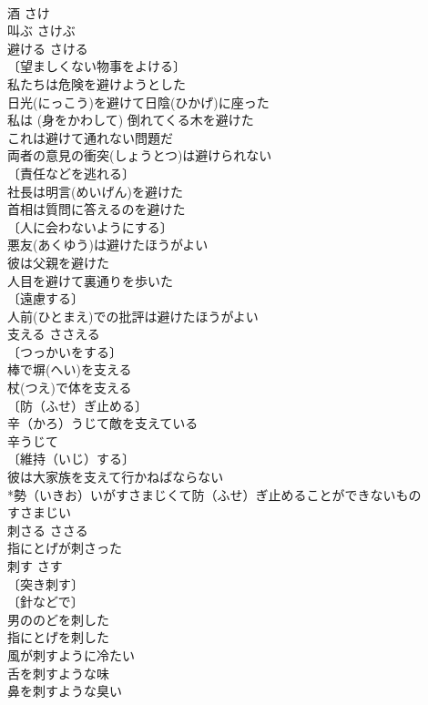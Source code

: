 \documentclass[8pt]{extreport}
\begin{document}
\begin{CJK}{UTF8}{min}
\\	酒	さけ	
\\	叫ぶ	さけぶ	
\\	避ける	さける	
\\	〔望ましくない物事をよける〕
\\	私たちは危険を避けようとした 
\\	日光(にっこう)を避けて日陰(ひかげ)に座った 
\\	私は (身をかわして) 倒れてくる木を避けた 
\\	これは避けて通れない問題だ 
\\	両者の意見の衝突(しょうとつ)は避けられない 
\\	〔責任などを逃れる〕
\\	社長は明言(めいげん)を避けた 
\\	首相は質問に答えるのを避けた 
\\	〔人に会わないようにする〕
\\	悪友(あくゆう)は避けたほうがよい 
\\	彼は父親を避けた 
\\	人目を避けて裏通りを歩いた 
\\	〔遠慮する〕
\\	人前(ひとまえ)での批評は避けたほうがよい 
\\	支える	ささえる	
\\	〔つっかいをする〕
\\	棒で塀(へい)を支える 
\\	杖(つえ)で体を支える 
\\	〔防（ふせ）ぎ止める〕　
\\	辛（かろ）うじて敵を支えている 
\\	辛うじて　 
\\	〔維持（いじ）する〕
\\	彼は大家族を支えて行かねばならない 
\\	*勢（いきお）いがすさまじくて防（ふせ）ぎ止めることができないもの 
\\	すさまじい　
\\	刺さる	ささる	
\\	指にとげが刺さった 
\\	刺す	さす	
\\	〔突き刺す〕
\\	〔針などで〕
\\	男ののどを刺した 
\\	指にとげを刺した 
\\	風が刺すように冷たい 
\\	舌を刺すような味 
\\	鼻を刺すような臭い 

\end{CJK}
\end{document}
